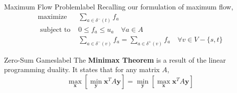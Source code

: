 	\begin{ex}{Maximum Flow Problem}{label}
		Recalling our formulation of maximum flow,
		\[
		\begin{array}{ll}
				\operatorname{maximize} & \sum_{a \in \delta^-(t)} f_{a} \\
				\text{ subject to } & 0 \leq f_a \leq u_a \quad \forall a \in A \\
				& \sum_{a \in \delta^{-}(v)} f_{a} = \sum_{a \in \delta^{+}(v)} f_{a} \quad \forall v \in V - \{s,t\}
			\end{array}
		\]
	\end{ex}

	\begin{ex}{Zero-Sum Games}{label}
		The \textbf{Minimax Theorem} is a result of the linear programming duality. It states that for any matrix $A$,
		\[\max _{\mathbf{x}}\left[\min _{\mathbf{y}} \mathbf{x}^{T} A \mathbf{y}\right]=\min _{\mathbf{y}}\left[\max _{\mathbf{x}} \mathbf{x}^{T} A \mathbf{y}\right]\]
	\end{ex}